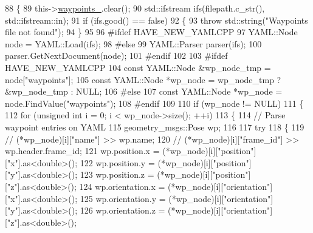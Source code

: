 \begin{DoxyCode}
88 \{
89   this->\hyperlink{classmove__base__z__client_1_1WaypointNavigator_a83e4e39987eaf1c8856d32d581eb4cd0}{waypoints\_}.clear();
90   std::ifstream ifs(filepath.c\_str(), std::ifstream::in);
91   \textcolor{keywordflow}{if} (ifs.good() == \textcolor{keyword}{false})
92   \{
93     \textcolor{keywordflow}{throw} std::string(\textcolor{stringliteral}{"Waypoints file not found"});
94   \}
95 
96 \textcolor{preprocessor}{#ifdef HAVE\_NEW\_YAMLCPP}
97   YAML::Node node = YAML::Load(ifs);
98 \textcolor{preprocessor}{#else}
99   YAML::Parser parser(ifs);
100   parser.GetNextDocument(node);
101 \textcolor{preprocessor}{#endif}
102 
103 \textcolor{preprocessor}{#ifdef HAVE\_NEW\_YAMLCPP}
104   \textcolor{keyword}{const} YAML::Node &wp\_node\_tmp = node[\textcolor{stringliteral}{"waypoints"}];
105   \textcolor{keyword}{const} YAML::Node *wp\_node = wp\_node\_tmp ? &wp\_node\_tmp : NULL;
106 \textcolor{preprocessor}{#else}
107   \textcolor{keyword}{const} YAML::Node *wp\_node = node.FindValue(\textcolor{stringliteral}{"waypoints"});
108 \textcolor{preprocessor}{#endif}
109 
110   \textcolor{keywordflow}{if} (wp\_node != NULL)
111   \{
112     \textcolor{keywordflow}{for} (\textcolor{keywordtype}{unsigned} \textcolor{keywordtype}{int} i = 0; i < wp\_node->size(); ++i)
113     \{
114       \textcolor{comment}{// Parse waypoint entries on YAML}
115       geometry\_msgs::Pose wp;
116 
117       \textcolor{keywordflow}{try}
118       \{
119         \textcolor{comment}{// (*wp\_node)[i]["name"] >> wp.name;}
120         \textcolor{comment}{// (*wp\_node)[i]["frame\_id"] >> wp.header.frame\_id;}
121         wp.position.x = (*wp\_node)[i][\textcolor{stringliteral}{"position"}][\textcolor{stringliteral}{"x"}].as<\textcolor{keywordtype}{double}>();
122         wp.position.y = (*wp\_node)[i][\textcolor{stringliteral}{"position"}][\textcolor{stringliteral}{"y"}].as<\textcolor{keywordtype}{double}>();
123         wp.position.z = (*wp\_node)[i][\textcolor{stringliteral}{"position"}][\textcolor{stringliteral}{"z"}].as<\textcolor{keywordtype}{double}>();
124         wp.orientation.x = (*wp\_node)[i][\textcolor{stringliteral}{"orientation"}][\textcolor{stringliteral}{"x"}].as<\textcolor{keywordtype}{double}>();
125         wp.orientation.y = (*wp\_node)[i][\textcolor{stringliteral}{"orientation"}][\textcolor{stringliteral}{"y"}].as<\textcolor{keywordtype}{double}>();
126         wp.orientation.z = (*wp\_node)[i][\textcolor{stringliteral}{"orientation"}][\textcolor{stringliteral}{"z"}].as<\textcolor{keywordtype}{double}>();

\end{DoxyCode}
